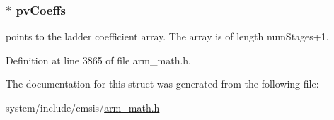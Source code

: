 \subsubsection[{\texorpdfstring{pv\+Coeffs}{pvCoeffs}}]{$\ast$ pv\+Coeffs}\hypertarget{structarm__iir__lattice__instance__f32_a0f8815744fade9c580d44277ff802308}{}\label{structarm__iir__lattice__instance__f32_a0f8815744fade9c580d44277ff802308}
points to the ladder coefficient array. The array is of length num\+Stages+1. 

Definition at line 3865 of file arm\+\_\+math.\+h.



The documentation for this struct was generated from the following file\+:\begin{DoxyCompactItemize}
\item 
system/include/cmsis/\hyperlink{arm__math_8h}{arm\+\_\+math.\+h}\end{DoxyCompactItemize}
